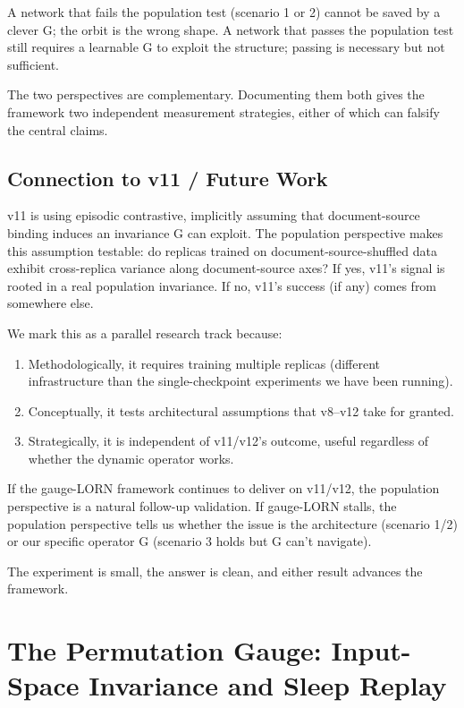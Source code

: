 \documentclass[11pt, a4paper]{article}
\theoremstyle{plain}
\theoremstyle{definition}
\theoremstyle{remark}
\begin{document}
A network that fails the population test (scenario 1 or 2) cannot be saved by a clever G; the orbit is the wrong shape.
A network that passes the population test still requires a learnable G to exploit the structure; passing is necessary but not sufficient.

The two perspectives are complementary.
Documenting them both gives the framework two independent measurement strategies, either of which can falsify the central claims.

\subsection{Connection to v11 / Future Work}

v11 is using episodic contrastive, implicitly assuming that document-source binding induces an invariance G can exploit.
The population perspective makes this assumption testable: do replicas trained on document-source-shuffled data exhibit cross-replica variance along document-source axes?
If yes, v11's signal is rooted in a real population invariance.
If no, v11's success (if any) comes from somewhere else.

We mark this as a parallel research track because:
\begin{enumerate}[nosep]
\item Methodologically, it requires training multiple replicas (different infrastructure than the single-checkpoint experiments we have been running).
\item Conceptually, it tests architectural assumptions that v8--v12 take for granted.
\item Strategically, it is independent of v11/v12's outcome, useful regardless of whether the dynamic operator works.
\end{enumerate}

If the gauge-LORN framework continues to deliver on v11/v12, the population perspective is a natural follow-up validation.
If gauge-LORN stalls, the population perspective tells us whether the issue is the architecture (scenario 1/2) or our specific operator G (scenario 3 holds but G can't navigate).

The experiment is small, the answer is clean, and either result advances the framework.


\section{The Permutation Gauge: Input-Space Invariance and Sleep Replay}
\label{sec:permutation-gauge}
\end{document}
